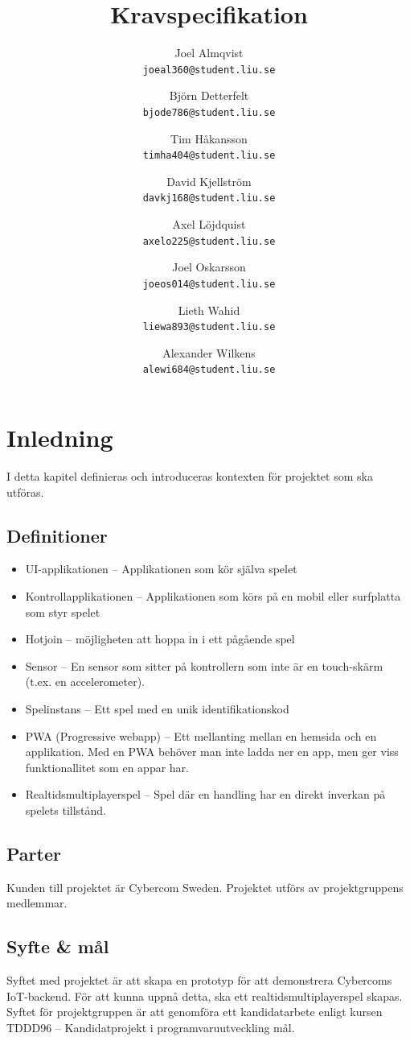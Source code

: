 \documentclass[10pt]{article}
\title{Kravspecifikation}
\author{
    Joel Almqvist\\
    \texttt{joeal360@student.liu.se}
    \and
    Björn Detterfelt\\
    \texttt{bjode786@student.liu.se}
    \and
    Tim Håkansson\\
    \texttt{timha404@student.liu.se}
    \and
    David Kjellström\\
    \texttt{davkj168@student.liu.se}
    \and
    Axel Löjdquist\\
    \texttt{axelo225@student.liu.se}
    \and
    Joel Oskarsson\\
    \texttt{joeos014@student.liu.se}
    \and
    Lieth Wahid\\
    \texttt{liewa893@student.liu.se}
    \and
    Alexander Wilkens\\
    \texttt{alewi684@student.liu.se}
}
\begin{document}
\maketitle
\pagebreak
\tableofcontents
\pagebreak
\section{Inledning}
	I detta kapitel definieras och introduceras kontexten för projektet som ska utföras.

	\subsection{Definitioner}
		\begin{itemize}
		\item UI-applikationen -- Applikationen som kör själva spelet
		\item Kontrollapplikationen -- Applikationen som körs på en mobil eller surfplatta som styr spelet
		\item Hotjoin -- möjligheten att hoppa in i ett pågående spel
		\item Sensor -- En sensor som sitter på kontrollern som inte är en touch-skärm (t.ex. en accelerometer).
		\item Spelinstans -- Ett spel med en unik identifikationskod
		\item PWA (Progressive webapp) -- Ett mellanting mellan en hemsida och en applikation. Med en PWA behöver man inte ladda ner en app, men ger viss funktionallitet som en appar har.
		\item Realtidsmultiplayerspel -- Spel där en handling har en direkt inverkan på spelets tillstånd.
		\end{itemize}	

	\subsection{Parter}
	Kunden till projektet är Cybercom Sweden. Projektet utförs av projektgruppens medlemmar.
	
	\subsection{Syfte \& mål}
		Syftet med projektet är att skapa en prototyp för att demonstrera Cybercoms IoT-backend. För att kunna uppnå detta, ska ett realtidsmultiplayerspel skapas. Syftet för projektgruppen är att genomföra ett kandidatarbete enligt kursen TDDD96 -- Kandidatprojekt i programvaruutveckling mål.
	
\end{document}
